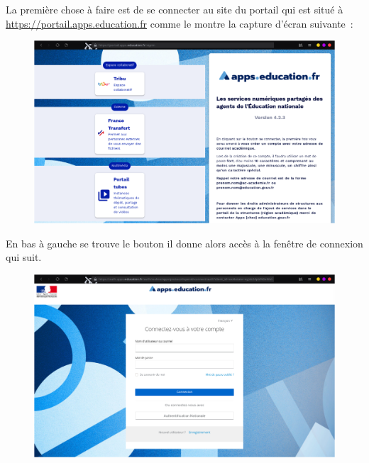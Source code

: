\documentclass[a4paper, 11pt]{book}
\begin{document}
La première chose à faire est de se connecter au site du portail qui est situé à \url{https://portail.apps.education.fr} comme le montre la capture d'écran suivante~:
\begin{figure}
    \centering
    \includegraphics{Captures/portail.site.web.png}
\end{figure}

En bas à gauche se trouve le bouton  il donne alors accès à la fenêtre de connexion qui suit. 
\begin{figure}
	\centering
	\includegraphics{./Captures/portail.site.web.connexion.png}
\end{figure}
\end{document}
